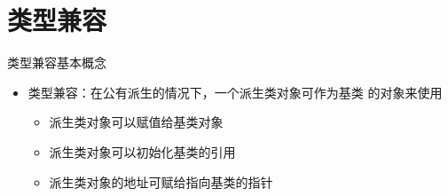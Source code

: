 

\section[类型兼容]{类型兼容}\label{sec:chap05-sec04}
\begin{frame}[t, fragile]{类型兼容}{基本概念}%
  \stretchon
  \begin{itemize}
  \item \alert{类型兼容}：在公有派生的情况下，一个派生类对象可作为基类
    的对象来使用
    \begin{itemize}
    \item 派生类对象可以赋值给基类对象
    \item 派生类对象可以初始化基类的引用
    \item 派生类对象的地址可赋给指向基类的指针
    \end{itemize}
  \end{itemize}
  \stretchoff
\end{frame}

